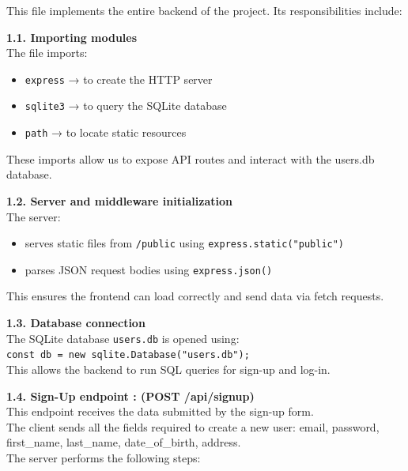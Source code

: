 \documentclass[11pt,a4paper]{report}
\begin{document}
 This file implements the entire backend of the project.  Its responsibilities include:

\textbf{1.1. Importing modules}\\
The file imports:
\begin{itemize}
    \item\texttt{express} → to create the HTTP server
    \item\texttt{sqlite3} → to query the SQLite database
    \item\texttt{path} → to locate static resources
\end{itemize}

These imports allow us to expose API routes and interact with the users.db database.

\textbf{1.2. Server and middleware initialization}\\
The server:
\begin{itemize}
    \item serves static files from \texttt{/public} using \texttt{express.static("public")}
    \item parses JSON request bodies using \texttt{express.json()}
\end{itemize}

This ensures the frontend can load correctly and send data via fetch requests.

\textbf{1.3. Database connection}\\
The SQLite database \texttt{users.db} is opened using:\\
\texttt{const db = new sqlite.Database("users.db");}\\
This allows the backend to run SQL queries for sign-up and log-in.

\textbf{1.4. Sign-Up endpoint : (POST /api/signup)}\\
This endpoint receives the data submitted by the sign-up form.\\
 The client sends all the fields required to create a new user: email, password, first\_name, last\_name, date\_of\_birth, address.\\
The server performs the following steps:
\end{document}
